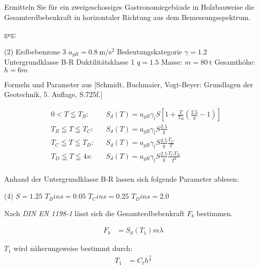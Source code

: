 
Ermitteln Sie für ein zweigeschossiges Gastronomiegebäude in Holzbauweise die Gesamterdbebenkraft in horizontaler Richtung
aus dem Bemessungsspektrum.

\begin{minipage}[t]{\linewidth}
    geg:
    \begin{tasks} (2)
        \task[] Erdbebenzone 3
        \task[] $a_{gR} = \SI{0.8}{\metre\per\second^2}$
        \task[] Bedeutungskategorie 
        \task[] $\gamma = 1.2$
        \task[] Untergrundklasse B-R
        \task[]
        \task[] Duktilitätsklasse 1
        \task[] $q = 1.5$
        \task[] Masse: $m =\SI{80}{\tonne}$
        \task[] Gesamthöhe: $h = 6m$
    \end{tasks}
\end{minipage}

Formeln und Parameter aus [Schmidt, Buchmaier, Vogt-Beyer: Grundlagen der Geotechnik, 5. Auflage, S.725f.]

\begin{align*}
    &0 < T \leqq T_B: &&S_d(T) = a_{gR} \gamma_l S [1 + \frac{T}{T_B}(\frac{2.5}{q} -1)] \\
    &T_B \leqq T \leqq T_C: &&S_d(T) = a_{gR} \gamma_l S \frac{2.5}{q} \\
    &T_C \leqq T \leqq T_D: &&S_d(T) = a_{gR} \gamma_l S \frac{2.5}{q} \frac{T_C}{T} \\
    &T_D \leqq T \leqq 4s: &&S_d(T) = a_{gR} \gamma_l S \frac{2.5}{q} \frac{T_C T_D}{T^2} \\
\end{align*}

Anhand der Untergrundklasse B-R lassen sich folgende Parameter ablesen:
\begin{tasks} (4)
    \task[] $S = 1.25$
    \task[] $T_B in s = 0.05$
    \task[] $T_C in s = 0.25$
    \task[] $T_D in s = 2.0$
\end{tasks}

Nach \textit{DIN EN 1198-1} lässt sich die Gesamterdbebenkraft $F_b$ bestimmen.

\begin{align}
    F_b &= S_d(T_1) m \lambda
\end{align}

$T_1$ wird näherungsweise bestimmt durch:
\begin{align}
    T_1 &= C_t h^{\frac{3}{4}}
\end{align}

